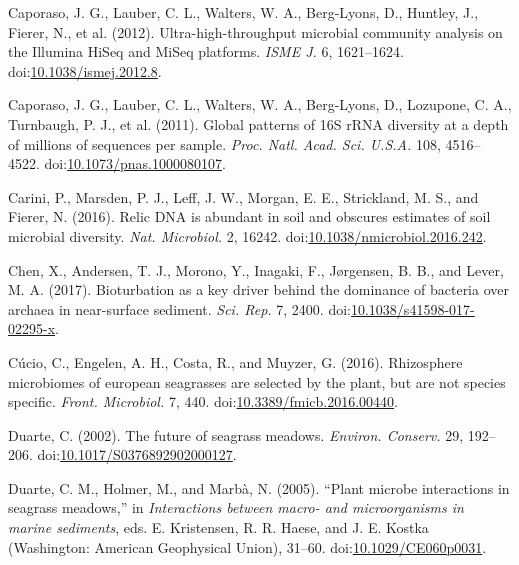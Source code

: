\documentclass[12pt,]{article}
\begin{document}
\leavevmode\hypertarget{ref-Caporaso2012a}{}%
Caporaso, J. G., Lauber, C. L., Walters, W. A., Berg-Lyons, D., Huntley,
J., Fierer, N., et al. (2012). Ultra-high-throughput microbial community
analysis on the Illumina HiSeq and MiSeq platforms. \emph{ISME J.} 6,
1621--1624.
doi:\href{https://doi.org/10.1038/ismej.2012.8}{10.1038/ismej.2012.8}.

\leavevmode\hypertarget{ref-Caporaso2011a}{}%
Caporaso, J. G., Lauber, C. L., Walters, W. A., Berg-Lyons, D.,
Lozupone, C. A., Turnbaugh, P. J., et al. (2011). Global patterns of 16S
rRNA diversity at a depth of millions of sequences per sample.
\emph{Proc. Natl. Acad. Sci. U.S.A.} 108, 4516--4522.
doi:\href{https://doi.org/10.1073/pnas.1000080107}{10.1073/pnas.1000080107}.

\leavevmode\hypertarget{ref-Carini2016}{}%
Carini, P., Marsden, P. J., Leff, J. W., Morgan, E. E., Strickland, M.
S., and Fierer, N. (2016). Relic DNA is abundant in soil and obscures
estimates of soil microbial diversity. \emph{Nat. Microbiol.} 2, 16242.
doi:\href{https://doi.org/10.1038/nmicrobiol.2016.242}{10.1038/nmicrobiol.2016.242}.

\leavevmode\hypertarget{ref-Chen2017}{}%
Chen, X., Andersen, T. J., Morono, Y., Inagaki, F., Jørgensen, B. B.,
and Lever, M. A. (2017). Bioturbation as a key driver behind the
dominance of bacteria over archaea in near-surface sediment. \emph{Sci.
Rep.} 7, 2400.
doi:\href{https://doi.org/10.1038/s41598-017-02295-x}{10.1038/s41598-017-02295-x}.

\leavevmode\hypertarget{ref-Cucio2016a}{}%
Cúcio, C., Engelen, A. H., Costa, R., and Muyzer, G. (2016). Rhizosphere
microbiomes of european seagrasses are selected by the plant, but are
not species specific. \emph{Front. Microbiol.} 7, 440.
doi:\href{https://doi.org/10.3389/fmicb.2016.00440}{10.3389/fmicb.2016.00440}.

\leavevmode\hypertarget{ref-Duarte2002}{}%
Duarte, C. (2002). The future of seagrass meadows. \emph{Environ.
Conserv.} 29, 192--206.
doi:\href{https://doi.org/10.1017/S0376892902000127}{10.1017/S0376892902000127}.

\leavevmode\hypertarget{ref-Duarte2005}{}%
Duarte, C. M., Holmer, M., and Marbà, N. (2005). ``Plant microbe
interactions in seagrass meadows,'' in \emph{Interactions between macro-
and microorganisms in marine sediments}, eds. E. Kristensen, R. R.
Haese, and J. E. Kostka (Washington: American Geophysical Union),
31--60.
doi:\href{https://doi.org/10.1029/CE060p0031}{10.1029/CE060p0031}.
\end{document}
